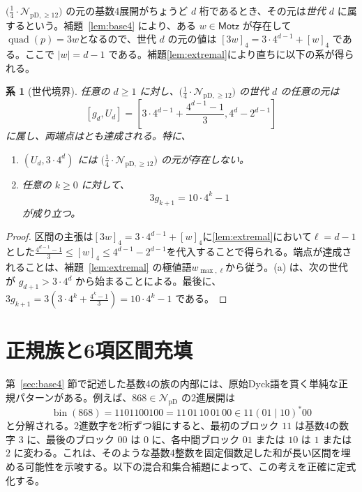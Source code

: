 \documentclass[12pt]{ltjsarticle}
\theoremstyle{plain}
\newtheorem{corollary}[theorem]{系}
\theoremstyle{definition}
\theoremstyle{plain}
\newcommand{\NpD}{\mathcal{N}_{\mathrm{pD}}}
\newcommand{\Pset}{%
  \bigl(\tfrac{1}{4}\cdot\mathcal{N}_{\mathrm{pD},\geq 12}\bigr)%
}
\begin{document}
$\Pset$ の元の基数4展開がちょうど $d$ 桁であるとき、その元は\emph{世代 $d$} に属するという。補題~\ref{lem:base4} により、ある $w\in\mathsf{Motz}$ が存在して$ \operatorname{quad}(p)=3w$となるので、世代 $d$ の元の値は $[3w]_4=3\cdot4^{d-1}+[w]_4$ である。ここで $|w|=d-1$ である。補題\ref{lem:extremal}により直ちに以下の系が得られる。

\begin{corollary}[世代境界]\label{cor:gen}
任意の $d\geq1$ に対し、$\Pset$ の世代 $d$ の任意の元は
\begin{equation}\label{eq:generation-interval}
  [g_d,U_d]
  =\left[
  3\cdot4^{d-1}+\frac{4^{d-1}-1}{3},
  4^d-2^{d-1}
  \right]
\end{equation}
に属し、両端点はとも達成される。特に、
\begin{enumerate}[label=\textup{(\alph*)}]
\item $(U_d,3\cdot4^d)$ には $\Pset$ の元が存在しない。
\item 任意の $k\geq0$ に対して、
\begin{equation}\label{eq:three-g}
  3g_{k+1}=10\cdot4^k-1
\end{equation}
が成り立つ。
\end{enumerate}
\end{corollary}

\begin{proof}
区間の主張は$[3w]_4=3\cdot4^{d-1}+[w]_4$に\eqref{lem:extremal}において$\ell=d-1$とした$\frac{4^{d-1}-1}{3}\leq[w]_4\leq4^{d-1}-2^{d-1}$を代入することで得られる。端点が達成されることは、補題~\ref{lem:extremal} の極値語$w_{\max,\ell}$から従う。(a) は、次の世代が $g_{d+1}>3\cdot4^d$ から始まることによる。最後に、
$  3g_{k+1}
  =3\left(3\cdot4^k+\frac{4^k-1}{3}\right)
  =10\cdot4^k-1$
である。
\end{proof}

\section{正規族と6項区間充填}\label{sec:regular}

第~\ref{sec:base4} 節で記述した基数4の族の内部には、原始Dyck語を貫く単純な正規パターンがある。例えば、$868\in\NpD$ の2進展開は
\[
 \operatorname{bin}(868)=1101100100=11\,01\,10\,01\,00
 \in 11(01\mid10)^*00
\]
と分解される。2進数字を2桁ずつ組にすると、最初のブロック $11$ は基数4の数字 $3$ に、最後のブロック $00$ は $0$ に、各中間ブロック $01$ または $10$ は $1$ または $2$ に変わる。これは、そのような基数4整数を固定個数足した和が長い区間を埋める可能性を示唆する。以下の混合和集合補題によって、この考えを正確に定式化する。
\end{document}
